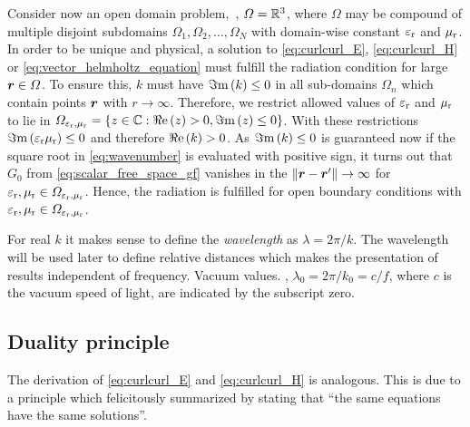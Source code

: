 Consider now an open domain problem,~\ie, $\Omega = \mathbb{R}^3$, where $\Omega$ may
be compound of multiple disjoint subdomains
$\Omega_1, \Omega_2, \dots, \Omega_N$ with domain-wise constant $\varepsilon_{\mathrm{r}}$ and
$\mu_{\mathrm{r}}$.
In order to be unique and physical, a solution to \eqref{eq:curlcurl_E},
\eqref{eq:curlcurl_H} or \eqref{eq:vector_helmholtz_equation} must fulfill
the radiation condition for large $\robs \in \Omega$.
To ensure this, $k$ must have $\Im\mathrm{m}\left(k\right) \leq 0$ in all sub-domains $\Omega_n$
which contain points $\robs$ with $r \to \infty$.
Therefore, we restrict allowed values of $\varepsilon_{\mathrm{r}}$ and $\mu_{\mathrm{r}}$ to lie in
$\Omega_{\varepsilon_{\mathrm{r}},\mu_{\mathrm{r}}} = \left\{z \in \mathbb{C} : \Re\mathrm{e}\left(z\right) > 0, \Im\mathrm{m}\left(z\right) \leq 0\right\}$.
With these restrictions $\Im\mathrm{m}\left(\varepsilon_{\mathrm{r}} \mu_{\mathrm{r}}\right) \leq 0$ and therefore $\Re\mathrm{e}\left(k\right) > 0$.
As $\Im\mathrm{m}\left(k\right) \leq 0$ is guaranteed now if the square root in
\eqref{eq:wavenumber} is evaluated with positive sign, it turns out that
$G_0$ from \eqref{eq:scalar_free_space_gf} vanishes in the
$\rdiffNorm \to \infty$ for $\varepsilon_{\mathrm{r}}, \mu_{\mathrm{r}} \in \Omega_{\varepsilon_{\mathrm{r}},\mu_{\mathrm{r}}}$.
Hence, the radiation is fulfilled for open boundary conditions with
$\varepsilon_{\mathrm{r}}, \mu_{\mathrm{r}} \in \Omega_{\varepsilon_{\mathrm{r}},\mu_{\mathrm{r}}}$.

For real $k$ it makes sense to define the \emph{wavelength} as
$\lambda = 2\pi / k$.
The wavelength will be used later to define relative distances which makes
the presentation of results independent of frequency.
Vacuum values. \eg, $\lambda_0 = 2\pi / k_0 = c / f$,
where $c$ is the vacuum speed of light, are indicated by the subscript zero.









\subsection{Duality principle}
\label{subsec:duality_principle}

The derivation of \eqref{eq:curlcurl_E} and \eqref{eq:curlcurl_H} is analogous.
This is due to a principle which \textcite[\S12-1]{Feynman2011} felicitously
summarized by stating that \enquote{the same equations have the same solutions}.

